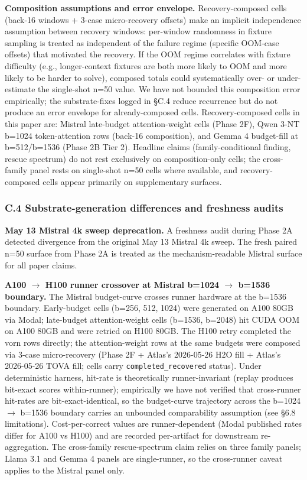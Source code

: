 \documentclass[
]{article}
\begin{document}
\textbf{Composition assumptions and error envelope.} Recovery-composed
cells (back-16 windows + 3-case micro-recovery offsets) make an implicit
independence assumption between recovery windows: per-window randomness
in fixture sampling is treated as independent of the failure regime
(specific OOM-case offsets) that motivated the recovery. If the OOM
regime correlates with fixture difficulty (e.g., longer-context
fixtures are both more likely to OOM and more likely to be harder to
solve), composed totals could systematically over- or under-estimate
the single-shot n=50 value. We have not bounded this composition error
empirically; the substrate-fixes logged in §C.4 reduce recurrence but do
not produce an error envelope for already-composed cells.
Recovery-composed cells in this paper are: Mistral late-budget
attention-weight cells (Phase 2F), Qwen 3-NT b=1024 token-attention rows
(back-16 composition), and Gemma 4 budget-fill at b=512/b=1536 (Phase
2B Tier 2). Headline claims (family-conditional finding, rescue
spectrum) do not rest exclusively on composition-only cells; the
cross-family panel rests on single-shot n=50 cells where available, and
recovery-composed cells appear primarily on supplementary surfaces.

\subsubsection{C.4 Substrate-generation differences and freshness
audits}\label{c-4-substrate-generation-differences}

\textbf{May 13 Mistral 4k sweep deprecation.} A freshness audit during
Phase 2A detected divergence from the original May 13 Mistral 4k sweep.
The fresh paired n=50 surface from Phase 2A is treated as the
mechanism-readable Mistral surface for all paper claims.

\textbf{A100 $\rightarrow$ H100 runner crossover at Mistral b=1024
$\rightarrow$ b=1536 boundary.} The Mistral budget-curve crosses runner
hardware at the b=1536 boundary. Early-budget cells (b=256, 512, 1024)
were generated on A100 80GB via Modal; late-budget attention-weight
cells (b=1536, b=2048) hit CUDA OOM on A100 80GB and were retried on
H100 80GB. The H100 retry completed the vorn rows directly; the
attention-weight rows at the same budgets were composed via 3-case
micro-recovery (Phase 2F + Atlas's 2026-05-26 H2O fill + Atlas's
2026-05-26 TOVA fill; cells carry \texttt{completed\_recovered}
status). Under deterministic harness, hit-rate is theoretically
runner-invariant (replay produces bit-exact scores within-runner);
empirically we have not verified that cross-runner hit-rates are
bit-exact-identical, so the budget-curve trajectory across the b=1024
$\rightarrow$ b=1536 boundary carries an unbounded comparability
assumption (see §6.8 limitations). Cost-per-correct values are
runner-dependent (Modal published rates differ for A100 vs H100) and
are recorded per-artifact for downstream re-aggregation. The
cross-family rescue-spectrum claim relies on three family panels;
Llama 3.1 and Gemma 4 panels are single-runner, so the cross-runner
caveat applies to the Mistral panel only.
\end{document}
